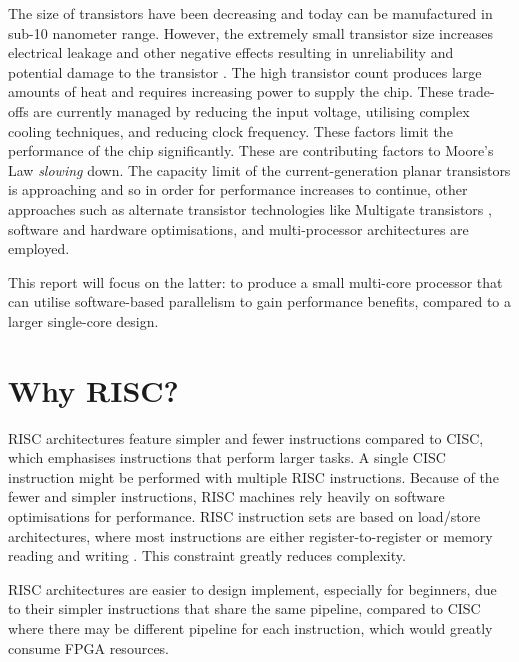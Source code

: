 \documentclass[11pt,a4paper]{report}
\begin{document}
{%

The size of transistors have been decreasing \cite{} and today can be manufactured in sub-10 nanometer range. However, the extremely small transistor size increases electrical leakage and other negative effects resulting in unreliability and potential damage to the transistor \cite{}.  The high transistor count produces large amounts of heat and requires increasing power to supply the chip. These trade-offs are currently managed by reducing the input voltage, utilising complex cooling techniques, and reducing clock frequency. These factors limit the performance of the chip significantly.
These are contributing factors to Moore's Law \textit{slowing} down. 
The capacity limit of the current-generation planar transistors is approaching and so in order for performance increases to continue, other approaches such as alternate transistor technologies like Multigate transistors \cite{subramanian2010multiple}, software and hardware optimisations, and multi-processor architectures are employed.

This report will focus on the latter: to produce a small multi-core processor that can utilise software-based parallelism to gain performance benefits, compared to a larger single-core design.

\section{Why RISC?}
RISC architectures feature simpler and fewer instructions compared to CISC, which emphasises instructions that perform larger tasks. A single CISC instruction might be performed with multiple RISC instructions. Because of the fewer and simpler instructions, RISC machines rely heavily on software optimisations for performance. 
RISC instruction sets are based on load/store architectures, where most instructions are either register-to-register or memory reading and writing \cite{flynn1995computer}. This constraint greatly reduces complexity.

RISC architectures are easier to design implement, especially for beginners, due to their simpler instructions that share the same pipeline, compared to CISC where there may be different pipeline for each instruction, which would greatly consume FPGA resources.

}
\end{document}

